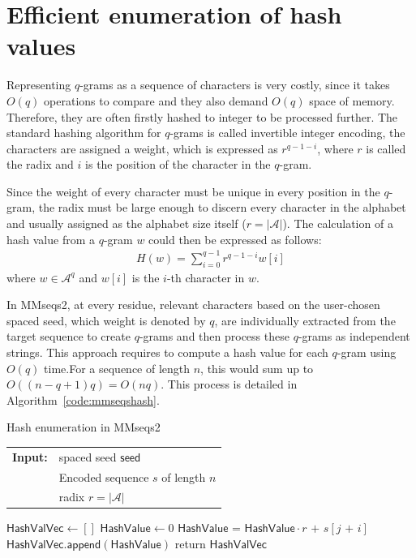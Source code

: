 \documentclass[twoside,a4paper,bsc]{master}
\newcommand{\Qgram}[1]{\(#1\)-gram}
\newcommand{\Seed}[0]{\mathsf{seed}}
\newcommand{\Span}[0]{\mathsf{span}}
\newcommand{\Append}[0]{\mathsf{append}}
\newcommand{\HashValue}[0]{\mathsf{HashValue}}
\newcommand{\HashValVec}[0]{\mathsf{HashValVec}}
\newcommand{\Alpha}[0]{\mathcal{A}}
\begin{document}
\section{Efficient enumeration of hash values}
Representing \Qgram{q}s as a sequence of characters is very costly, since it
takes \(O(q)\) operations to compare and they also demand \(O(q)\) space of
memory. Therefore, they are often firstly hashed to integer to be processed
further. The standard hashing algorithm for \Qgram{q}s is called invertible
integer encoding, the characters are assigned a weight, which is expressed as
\(r^{q-1-i}\), where \(r\) is called the radix and \(i\) is the position of the
character in the \Qgram{q}.

Since the weight of every character must be unique in every position in the
\Qgram{q}, the radix must be large enough to discern every character in
the alphabet and usually assigned as the alphabet size itself
(\(r=|\Alpha|\)).
The calculation of a hash value from a \Qgram{q} \(w\) could then be
expressed as follows:
\begin{align}
H(w) = \sum_{i=0}^{q-1}r^{q-1-i}w[i]\label{DefineHfunction}
\end{align}
where \(w\in\Alpha^q\) and \(w[i]\) is the \(i\)-th character in \(w\).

In MMseqs2, at every residue, relevant characters based on the user-chosen
spaced seed, which weight is denoted by \(q\), are individually
extracted from the target sequence to create \Qgram{q}s and then process
these \Qgram{q}s as independent strings. This approach requires to compute
a hash value for each \Qgram{q} using \(O(q)\) time.For a sequence of
length
\(n\), this would sum up to \(O((n-q+1)q)=O(nq)\). This process is detailed
in
Algorithm~\ref{code:mmseqshash}.
\begin{algorithm}[t]
\caption{Hash enumeration in MMseqs2}
\label{code:mmseqshash}
\begin{tabular}{@{}l@{~}l}
\textbf{Input:}
&spaced seed \(\Seed\)\\
&Encoded sequence \(s\) of length \(n\)\\
&radix \(r = |\Alpha|\)
\end{tabular}
\begin{algorithmic}
\State \(\HashValVec\gets []\)
\State \(\HashValue \gets 0\)
\For{\(i \in [0,\Seed.\Span)\)}
\If{\(\Seed[i]\)}
\State \(\HashValue\text{ = }\HashValue\cdot r\text{ + }s[j\text{ + }i]\)
\EndIf
\EndFor
\State \(\HashValVec .\Append(\HashValue)\)
\EndFor
\State return \(\HashValVec\)
\end{algorithmic}
\end{algorithm}
\end{document}
